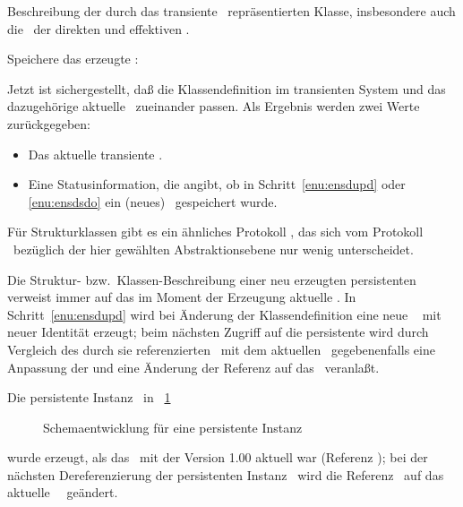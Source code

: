 \begin{infol}
\begin{block}
Beschreibung der durch das transiente \clsmo\ repr\"{a}sentierten Klasse,
insbesondere auch die \sltdo[e]\ der direkten und effektiven \Slt[s].
%
\item\label{enu:ensdsdo} Speichere das erzeugte \clsdo:\\
%
\end{block}%
%
\item Jetzt ist sichergestellt, da\ss{} die Klassendefinition im
transienten System und das dazugeh\"{o}rige aktuelle \clsdo\ zueinander
passen. Als Ergebnis werden zwei Werte zur\"{u}ckgegeben:
\begin{itemize}
%
\item Das aktuelle transiente \clsdo.
%
\item Eine Statusinformation, die angibt, ob in
Schritt~\ref{enu:ensdupd} oder \ref{enu:ensdsdo} ein (neues)
\clsdo\ gespeichert wurde.
%
\end{itemize}
%
\end{infol}
%
F\"{u}r Strukturklassen gibt es ein \"{a}hn\-li\-ches Protokoll
\stfn{\ensstdescr}, das sich vom Protokoll
\stfn{\enscldescr}\ bez\"{u}glich der hier gew\"{a}hlten Abstraktionsebene
nur wenig unterscheidet.
%
\par{}Die Struktur- bzw.\ Klassen-Beschreibung einer neu erzeugten
persistenten \representation{} verweist immer auf das im Moment der
Erzeugung aktuelle \clsdo. In Schritt~\ref{enu:ensdupd} wird bei
\"{A}nderung der Klassendefinition eine neue \ \cite[]{bib:sk87}
mit neuer Identit\"{a}t erzeugt; beim n\"{a}chsten Zugriff auf die
persistente \representation{} wird durch Vergleich des durch sie
referenzierten \clsdo[es]\ mit dem aktuellen
\clsdo\ gegebenenfalls eine Anpassung der 
\representation{} und eine \"{A}nderung der Referenz auf das
\clsdo\ veranla\ss{}t.
%
\par{}Die persistente Instanz \oiii\ in \figurename~\ref{fig:plsche} %
%
\begin{figure}[htbp]%
\ifbuch%
\centerline{}%
\else%
\centerline{}%
\fi%
\caption{Schemaentwicklung f\"{u}r eine persistente Instanz}%
\label{fig:plsche}%
\end{figure}%
%
wurde erzeugt, als das \clsdo\ mit der Version 1.00 aktuell war
(Referenz \oi); bei der n\"{a}chsten Dereferenzierung der persistenten
Instanz \oiii\ wird die Referenz \oi\ auf das
aktuelle \clsdo\ \oii\ ge\-\"{a}n\-dert.
%
